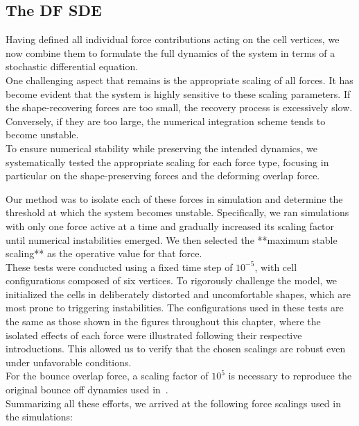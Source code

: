 \subsection{The DF SDE}
Having defined all individual force contributions acting on the cell vertices, we now combine them to formulate the full dynamics of the system in terms of a stochastic differential equation. \\
One challenging aspect that remains is the appropriate scaling of all forces.
It has become evident that the system is highly sensitive to these scaling parameters. 
If the shape-recovering forces are too small, the recovery process is excessively slow. 
Conversely, if they are too large, the numerical integration scheme tends to become unstable. \\ 
To ensure numerical stability while preserving the intended dynamics, we systematically tested the appropriate scaling for each force type, focusing in particular on the shape-preserving forces and the deforming overlap force.

Our method was to isolate each of these forces in simulation and determine the threshold at which the system becomes unstable. 
Specifically, we ran simulations with only one force active at a time and gradually increased its scaling factor until numerical instabilities emerged. 
We then selected the **maximum stable scaling** as the operative value for that force. \\
These tests were conducted using a fixed time step of $10^{-5}$, with cell configurations composed of six vertices. 
To rigorously challenge the model, we initialized the cells in deliberately distorted and uncomfortable shapes, which are most prone to triggering instabilities. 
The configurations used in these tests are the same as those shown in the figures throughout this chapter, where the isolated effects of each force were illustrated following their respective introductions. 
This allowed us to verify that the chosen scalings are robust even under unfavorable conditions. \\
For the bounce overlap force, a scaling factor of $10^5$ is necessary to reproduce the original bounce off dynamics used in~\cite{Bruna2012}. \\
Summarizing all these efforts, we arrived at the following force scalings used in the simulations:


